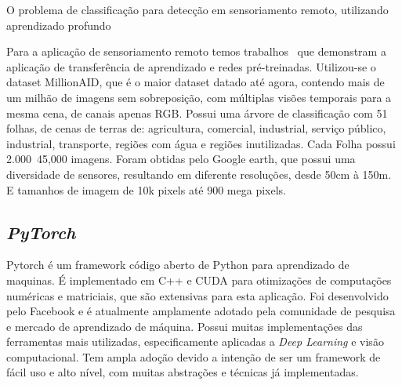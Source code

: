 O problema de classificação para detecção em sensoriamento remoto, utilizando aprendizado profundo~\cite{s20236936}


Para a aplicação de sensoriamento remoto temos trabalhos~\cite{wang2022empirical} que demonstram a aplicação de transferência de aprendizado e redes pré-treinadas. Utilizou-se o dataset MillionAID, que é o maior dataset datado até agora, contendo mais de um milhão de imagens sem sobreposição, com múltiplas visões temporais para a mesma cena, de canais apenas RGB. Possui uma árvore de classificação com 51 folhas, de cenas de terras de: agricultura, comercial, industrial, serviço público, industrial, transporte, regiões com água e regiões inutilizadas. Cada Folha possui 2.000~45,000 imagens. Foram obtidas pelo Google earth, que possui uma diversidade de sensores, resultando em diferente resoluções, desde 50cm à 150m. E tamanhos de imagem de 10k pixels até 900 mega pixels.




\subsection{\textit{PyTorch}}\label{sec:Cap2_PyTorch}
Pytorch é um framework código aberto de Python para aprendizado de maquinas. É implementado em C++ e CUDA para otimizações de computações numéricas e matriciais, que são extensivas para esta aplicação.
Foi desenvolvido pelo Facebook e é atualmente amplamente adotado pela comunidade de pesquisa e mercado de aprendizado de máquina. Possui muitas implementações das ferramentas mais utilizadas, especificamente aplicadas a \textit{Deep Learning} e visão computacional. Tem ampla adoção devido a intenção de ser um framework de fácil uso e alto nível, com muitas abstrações e técnicas já implementadas.



